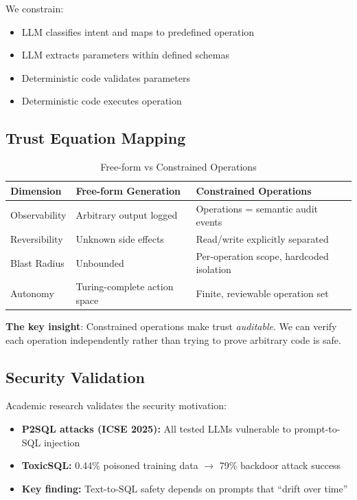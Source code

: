 We constrain:
\begin{itemize}
    \item LLM classifies intent and maps to predefined operation
    \item LLM extracts parameters within defined schemas
    \item Deterministic code validates parameters
    \item Deterministic code executes operation
\end{itemize}

\subsection{Trust Equation Mapping}
\label{subsec:constrained-trust-mapping}

\begin{table}[htbp]
\centering
\caption{Free-form vs Constrained Operations}
\label{tab:freeform-vs-constrained}
\begin{tabular}{lll}
\toprule
\textbf{Dimension} & \textbf{Free-form Generation} & \textbf{Constrained Operations} \\
\midrule
Observability & Arbitrary output logged & Operations = semantic audit events \\
Reversibility & Unknown side effects & Read/write explicitly separated \\
Blast Radius & Unbounded & Per-operation scope, hardcoded isolation \\
Autonomy & Turing-complete action space & Finite, reviewable operation set \\
\bottomrule
\end{tabular}
\end{table}

\textbf{The key insight}: Constrained operations make trust \textit{auditable}. We can verify each operation independently rather than trying to prove arbitrary code is safe.

\subsection{Security Validation}
\label{subsec:security-validation}

Academic research validates the security motivation:

\begin{itemize}
    \item \textbf{P2SQL attacks (ICSE 2025):} All tested LLMs vulnerable to prompt-to-SQL injection
    \item \textbf{ToxicSQL:} 0.44\% poisoned training data $\rightarrow$ 79\% backdoor attack success
    \item \textbf{Key finding:} Text-to-SQL safety depends on prompts that ``drift over time''
\end{itemize}

